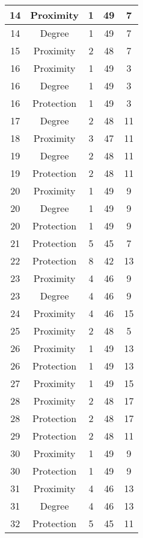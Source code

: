 \documentclass[results.tex]{subfiles}
\begin{document}
\begin{center}
\begin{tabular}{| c || c | c | c | c |}
    \hline
    14 & Proximity & 1 & 49 & 7 \\ 
    \hline
    14 & Degree & 1 & 49 & 7 \\ 
    \hline
    15 & Proximity & 2 & 48 & 7 \\ 
    \hline
    16 & Proximity & 1 & 49 & 3 \\ 
    \hline
    16 & Degree & 1 & 49 & 3 \\ 
    \hline
    16 & Protection & 1 & 49 & 3 \\ 
    \hline
    17 & Degree & 2 & 48 & 11 \\ 
    \hline
    18 & Proximity & 3 & 47 & 11 \\ 
    \hline
    19 & Degree & 2 & 48 & 11 \\ 
    \hline
    19 & Protection & 2 & 48 & 11 \\ 
    \hline
    20 & Proximity & 1 & 49 & 9 \\ 
    \hline
    20 & Degree & 1 & 49 & 9 \\ 
    \hline
    20 & Protection & 1 & 49 & 9 \\ 
    \hline
    21 & Protection & 5 & 45 & 7 \\ 
    \hline
    22 & Protection & 8 & 42 & 13 \\ 
    \hline
    23 & Proximity & 4 & 46 & 9 \\ 
    \hline
    23 & Degree & 4 & 46 & 9 \\ 
    \hline
    24 & Proximity & 4 & 46 & 15 \\ 
    \hline
    25 & Proximity & 2 & 48 & 5 \\ 
    \hline
    26 & Proximity & 1 & 49 & 13 \\ 
    \hline
    26 & Protection & 1 & 49 & 13 \\ 
    \hline
    27 & Proximity & 1 & 49 & 15 \\ 
    \hline
    28 & Proximity & 2 & 48 & 17 \\ 
    \hline
    28 & Protection & 2 & 48 & 17 \\ 
    \hline
    29 & Protection & 2 & 48 & 11 \\ 
    \hline
    30 & Proximity & 1 & 49 & 9 \\ 
    \hline
    30 & Protection & 1 & 49 & 9 \\ 
    \hline
    31 & Proximity & 4 & 46 & 13 \\ 
    \hline
    31 & Degree & 4 & 46 & 13 \\ 
    \hline
    32 & Protection & 5 & 45 & 11 \\ 

\end{tabular}
\end{center}
\end{document}
